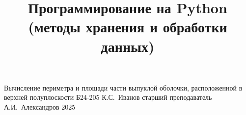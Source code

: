 \documentclass[a4paper,12pt]{memoir}
\begin{document}
\renewcommand{\contentsname}{{\Large{Содержание}\hfill}}

\title{Программирование на Python (методы хранения и обработки данных)}
{Вычисление периметра и площади части выпуклой оболочки, расположенной в верхней полуплоскости}
{Б24-205}
{К.\+С.~Иванов}
{старший преподаватель}
{А.\+И.~Александров}
{2025}





\newpage


\end{document}
